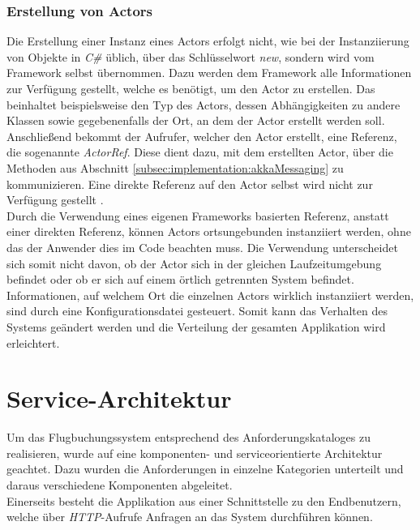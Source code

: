 \subsubsection{Erstellung von Actors}
\label{subsec:implementation:actorCreation}
Die Erstellung einer Instanz eines Actors erfolgt nicht, wie bei der Instanziierung von Objekte in \textit{C\#} üblich, über das Schlüsselwort \textit{new}, sondern wird vom Framework selbst übernommen. Dazu werden dem Framework alle Informationen zur Verfügung gestellt, welche es benötigt, um den Actor zu erstellen. Das beinhaltet beispielsweise den Typ des Actors, dessen Abhängigkeiten zu andere Klassen sowie gegebenenfalls der Ort, an dem der Actor erstellt werden soll. Anschließend bekommt der Aufrufer, welcher den Actor erstellt, eine Referenz, die sogenannte \textit{ActorRef}. Diese dient dazu, mit dem erstellten Actor, über die Methoden aus Abschnitt \ref{subsec:implementation:akkaMessaging} zu kommunizieren. Eine direkte Referenz auf den Actor selbst wird nicht zur Verfügung gestellt \citep{Akka.NETCommunityAkka.NETDocumentation}. \\
Durch die Verwendung eines eigenen Frameworks basierten Referenz, anstatt einer direkten Referenz, können Actors ortsungebunden instanziiert werden, ohne das der Anwender dies im Code beachten muss. Die Verwendung unterscheidet sich somit nicht davon, ob der Actor sich in der gleichen Laufzeitumgebung befindet oder ob er sich auf einem örtlich getrennten System befindet. Informationen, auf welchem Ort die einzelnen Actors wirklich instanziiert werden, sind durch eine Konfigurationsdatei gesteuert. Somit kann das Verhalten des Systems geändert werden und die Verteilung der gesamten Applikation wird erleichtert.

\section{Service-Architektur}
\label{sec:implementation:serviceAndComponentOrientation}
Um das Flugbuchungssystem entsprechend des Anforderungskataloges zu realisieren, wurde auf eine komponenten- und serviceorientierte Architektur geachtet. Dazu wurden die Anforderungen in einzelne Kategorien unterteilt und daraus verschiedene Komponenten abgeleitet. \\
Einerseits besteht die Applikation aus einer Schnittstelle zu den Endbenutzern, welche über \textit{HTTP}-Aufrufe Anfragen an das System durchführen können. 

